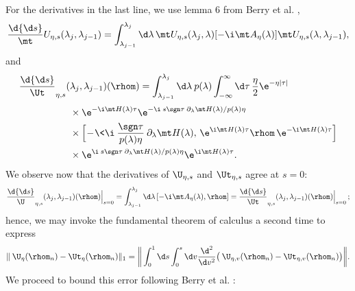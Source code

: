 For the derivatives in the last line, we use lemma 6 from Berry et al. \cite{Berry2020},
\begin{align}
    \frac\d{\d s} \mt U_{\eta, s}(\lambda_j, \lambda_{j-1}) = \int_{\lambda_{j-1}}^{\lambda_j} \d\lambda \, \mt U_{\eta, s}(\lambda_j, \lambda) [-\i \mt A_\eta(\lambda)] \mt U_{\eta, s}(\lambda, \lambda_{j-1}),
\end{align}
and
\begin{align}
    \frac\d{\d s} \Ut_{\eta, s}(&\lambda_j, \lambda_{j-1})(\rhom) = \int_{\lambda_{j-1}}^{\lambda_j} \d\lambda \> p(\lambda) \int_{-\infty}^\infty \d\tau \, \frac\eta2 \e^{-\eta|\tau|} \nonumber \\[1mm]
    &\times \e^{-\i \mt H(\lambda) \tau} \e^{-\i \> s \sgn\tau \> \partial_\lambda \mt H(\lambda) / p(\lambda) \eta} \nonumber \\
    &\times \Big[ \!-\!\<\i \> \frac{\sgn\tau}{p(\lambda) \eta} \> \partial_\lambda \mt H(\lambda), \, \e^{\i \mt H(\lambda) \tau} \rhom \, \e^{-\i \mt H(\lambda) \tau} \Big] \nonumber \\
    &\times \e^{\i \> s \sgn\tau \> \partial_\lambda \mt H(\lambda) / p(\lambda) \eta} \e^{\i \mt H(\lambda) \tau}.
\end{align}
We observe now that the derivatives of $\U_{\eta, s}$ and $\Ut_{\eta, s}$ agree at $s=0$:
\begin{align}
    \frac\d{\d s} \U_{\eta, s}(\lambda_j, \lambda_{j-1})(\rhom) \Big|_{s=0} = \int_{\lambda_{j-1}}^{\lambda_j} \d\lambda \, [-\i \mt A_\eta(\lambda), \rhom] = \frac\d{\d s} \Ut_{\eta, s}(\lambda_j, \lambda_{j-1})(\rhom) \Big|_{s=0} \, ;
\end{align}
hence, we may invoke the fundamental theorem of calculus a second time to express
\begin{align}
    \|\> \U_\eta(\rhom_n) - \Ut_\eta(\rhom_n)\|_1 = \bigg\| \int_0^1 \d s \int_0^s \d v \frac{\d^2}{\d v^2} \big( \> \U_{\eta, v}(\rhom_n) - \Ut_{\eta, v}(\rhom_n) \big) \bigg\|.
\end{align}
We proceed to bound this error following Berry et al. \cite[proof of theorem 5]{Berry2020}:
